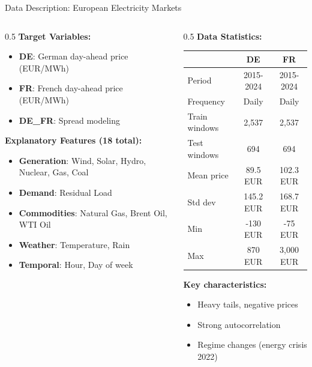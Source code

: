 \documentclass[aspectratio=169]{beamer}
\begin{document}
\begin{frame}{Data Description: European Electricity Markets}
\begin{columns}
\begin{column}{0.5\textwidth}
\textbf{Target Variables:}
\begin{itemize}
    \item \textbf{DE}: German day-ahead price (EUR/MWh)
    \item \textbf{FR}: French day-ahead price (EUR/MWh)
    \item \textbf{DE\_FR}: Spread modeling
\end{itemize}

\vspace{0.3cm}
\textbf{Explanatory Features (18 total):}
\begin{itemize}
    \item \textbf{Generation}: Wind, Solar, Hydro, Nuclear, Gas, Coal
    \item \textbf{Demand}: Residual Load
    \item \textbf{Commodities}: Natural Gas, Brent Oil, WTI Oil
    \item \textbf{Weather}: Temperature, Rain
    \item \textbf{Temporal}: Hour, Day of week
\end{itemize}
\end{column}

\begin{column}{0.5\textwidth}
\textbf{Data Statistics:}
\begin{table}
\scriptsize
\begin{tabular}{l|cc}
\toprule
& \textbf{DE} & \textbf{FR} \\
\midrule
Period & 2015-2024 & 2015-2024 \\
Frequency & Daily & Daily \\
Train windows & 2,537 & 2,537 \\
Test windows & 694 & 694 \\
Mean price & 89.5 EUR & 102.3 EUR \\
Std dev & 145.2 EUR & 168.7 EUR \\
Min & -130 EUR & -75 EUR \\
Max & 870 EUR & 3,000 EUR \\
\bottomrule
\end{tabular}
\end{table}

\vspace{0.2cm}
\textbf{Key characteristics:}
\begin{itemize}
    \item Heavy tails, negative prices
    \item Strong autocorrelation
    \item Regime changes (energy crisis 2022)
\end{itemize}
\end{column}
\end{columns}
\end{frame}
\end{document}
